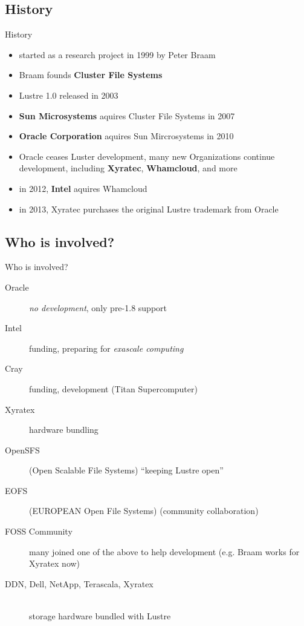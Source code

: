 \subsection{History}
\begin{frame}{History}
    \begin{itemize}
        \item started as a research project in 1999 by Peter Braam
        \item Braam founds \textbf{Cluster File Systems}
        \item Lustre 1.0 released in 2003
        \item \textbf{Sun Microsystems} aquires Cluster File Systems in 2007
        \item \textbf{Oracle Corporation} aquires Sun Mircrosystems in 2010
        \item Oracle ceases Luster development, many new Organizations continue
            development, including \textbf{Xyratec},  \textbf{Whamcloud}, and
            more
        \item in 2012, \textbf{Intel} aquires Whamcloud
        \item in 2013, Xyratec purchases the original Lustre trademark from Oracle
    \end{itemize}
\end{frame}

\subsection{Who is involved?}
\begin{frame}{Who is involved?}
    \begin{description}
        \item[Oracle] \emph{no development}, only pre-1.8 support
        \item[Intel] funding, preparing for \emph{exascale computing}
        \item[Cray] funding, development (Titan Supercomputer)
        \item[Xyratex] hardware bundling
        \item[OpenSFS] (Open Scalable File Systems) ``keeping Lustre open''
        \item[EOFS] (EUROPEAN Open File Systems) (community collaboration)
        \item[FOSS Community] many joined one of the above to help development
            (e.g. Braam works for Xyratex now)
        \item[DDN, Dell, NetApp, Terascala, Xyratex]\hfill \\
            storage hardware bundled with Lustre
    \end{description}
\end{frame}

